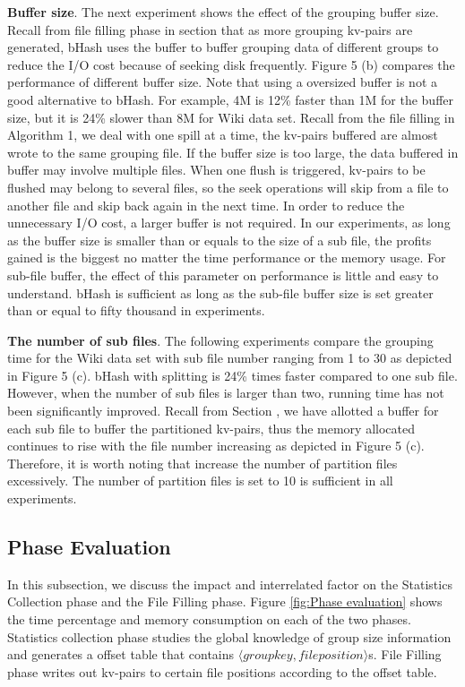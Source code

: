 \textbf{Buffer size}. The next experiment shows the effect of the grouping buffer size. Recall from file filling phase in section \uppercase\expandafter{} that as more grouping kv-pairs are generated, bHash uses the buffer to buffer grouping data of different groups to reduce the I/O cost because of seeking disk frequently. Figure 5 (b) compares the performance of different buffer size. Note that using a oversized buffer is not a good alternative to bHash. For example, 4M is 12\% faster than 1M for the buffer size, but it is 24\% slower than 8M for Wiki data set. Recall from the file filling in Algorithm 1, we deal with one spill at a time, the kv-pairs buffered are almost wrote to the same grouping file. If the buffer size is too large, the data buffered in buffer may involve multiple files. When one flush is triggered, kv-pairs to be flushed may belong to several files, so the seek operations will skip from a file to another file and skip back again in the next time. In order to reduce the unnecessary I/O cost, a larger buffer is not required. In our experiments, as long as the buffer size is smaller than or equals to the size of a sub file, the profits gained is the biggest no matter the time performance or the memory usage. For sub-file buffer, the effect of this parameter on performance is little and easy to understand. bHash is sufficient as long as the sub-file buffer size is set greater than or equal to fifty thousand in experiments.

\textbf{The number of sub files}. The following experiments compare the grouping time for the Wiki data set with sub file number ranging from 1 to 30 as depicted in Figure 5 (c). bHash with splitting is 24\% times faster compared to one sub file. However, when the number of sub files is larger than two, running time has not been significantly improved. Recall from Section \uppercase\expandafter{}, we have allotted a buffer for each sub file to buffer the partitioned kv-pairs, thus the memory allocated continues to rise with the file number increasing as depicted in Figure 5 (c). Therefore, it is worth noting that increase the number of partition files excessively. The number of partition files is set to 10 is sufficient in all experiments.
\subsection{Phase Evaluation}
In this subsection, we discuss the impact and interrelated factor on the Statistics Collection phase and the File Filling phase. Figure \ref{fig:Phase evaluation} shows the time percentage and memory consumption on each of the two phases. Statistics collection phase studies the global knowledge of group size information and generates a offset table that contains $\langle group key, file position\rangle$s. File Filling phase writes out kv-pairs to certain file positions according to the offset table.

